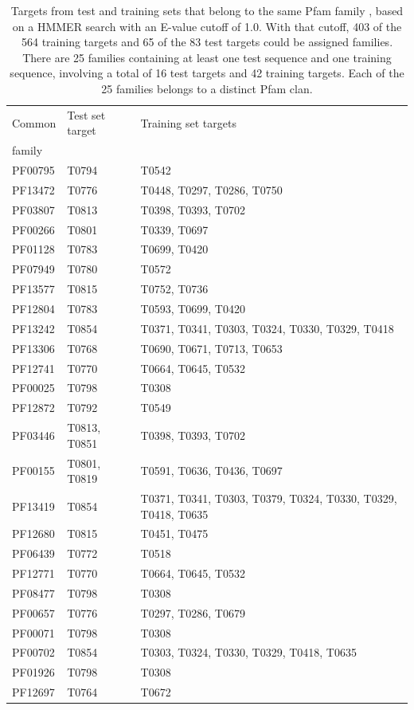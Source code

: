 \documentclass[letter,10pt]{article}
\begin{document}
\begin{table}[H]
\begin{center}
\caption{Targets from test and training sets that belong to the same
  Pfam family \cite{finn2016pfam}, based on a HMMER search
  \cite{finn2015hmmer} with an E-value cutoff of 1.0. With that
  cutoff, 403 of the 564 training targets and 65 of the 83 test
  targets could be assigned families. There are 25 families containing
  at least one test sequence and one training sequence, involving a
  total of 16 test targets and 42 training targets. Each of the 25
  families belongs to a distinct Pfam clan.}
%
\begin{tabular}{ l | l | l }

    Common & Test set target & Training set targets \\
    family & & \\
    \hline
    PF00795 & T0794 & T0542 \\ \hline
    PF13472 & T0776 & T0448, T0297, T0286, T0750 \\ \hline
    PF03807 & T0813 & T0398, T0393, T0702 \\ \hline
    PF00266 & T0801 & T0339, T0697 \\ \hline
    PF01128 & T0783 & T0699, T0420 \\ \hline
    PF07949 & T0780 & T0572 \\ \hline
    PF13577 & T0815 & T0752, T0736 \\ \hline
    PF12804 & T0783 & T0593, T0699, T0420 \\ \hline
    PF13242 & T0854 & T0371, T0341, T0303, T0324, T0330, T0329, T0418 \\ \hline
    PF13306 & T0768 & T0690, T0671, T0713, T0653 \\ \hline
    PF12741 & T0770 & T0664, T0645, T0532 \\ \hline
    PF00025 & T0798 & T0308 \\ \hline
    PF12872 & T0792 & T0549 \\ \hline
    PF03446 & T0813, T0851 & T0398, T0393, T0702 \\ \hline
    PF00155 & T0801, T0819 & T0591, T0636, T0436, T0697 \\ \hline
    PF13419 & T0854 & T0371, T0341, T0303, T0379, T0324, T0330, T0329, T0418, T0635 \\ \hline
    PF12680 & T0815 & T0451, T0475 \\ \hline
    PF06439 & T0772 & T0518 \\ \hline
    PF12771 & T0770 & T0664, T0645, T0532 \\ \hline
    PF08477 & T0798 & T0308 \\ \hline
    PF00657 & T0776 & T0297, T0286, T0679 \\ \hline
    PF00071 & T0798 & T0308 \\ \hline
    PF00702 & T0854 & T0303, T0324, T0330, T0329, T0418, T0635 \\ \hline
    PF01926 & T0798 & T0308 \\ \hline
    PF12697 & T0764 & T0672 \\ \hline
\end{tabular}
\label{Tbl:SharedPfam}
\end{center}
\end{table}
\end{document}
